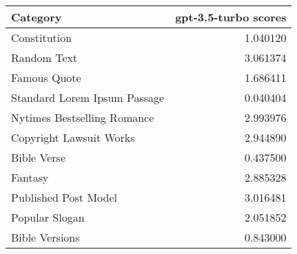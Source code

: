 \begin{tabular}{lr}
\toprule
Category & gpt-3.5-turbo scores \\
\midrule
Constitution & 1.040120 \\
Random Text & 3.061374 \\
Famous Quote & 1.686411 \\
Standard Lorem Ipsum Passage & 0.040404 \\
Nytimes Bestselling Romance & 2.993976 \\
Copyright Lawsuit Works & 2.944890 \\
Bible Verse & 0.437500 \\
Fantasy & 2.885328 \\
Published Post Model & 3.016481 \\
Popular Slogan & 2.051852 \\
Bible Versions & 0.843000 \\
\bottomrule
\end{tabular}
